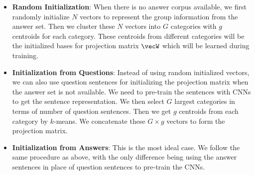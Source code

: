 \begin{itemize}

\item \textbf{Random Initialization}: When there is no answer corpus available, we first randomly initialize $N$ vectors 
to represent the group information from the answer set. 
Then we cluster these $N$ vectors into $G$ categories with $g$ centroids for each category. 
These centroids from different categories will be the initialized bases for projection matrix $\vecW$ which will be learned during training.
\item \textbf{Initialization from Questions}: Instead of using random initialized vectors, we can also use question sentences for initializing 
the projection matrix when the answer set is not available. We need to pre-train the sentences with CNNs to get the sentence representation. 
We then select $G$ largest categories in terms of number of question sentences. Then we get $g$ centroids from each category by $k$-means. 
We concatenate these $G\times g$ vectors to form the projection matrix. %
\item \textbf{Initialization from Answers}: This is the most ideal case. We follow the same procedure as above, with the only difference being using the answer sentences in place of question sentences to pre-train the CNNs. %
\end{itemize}
